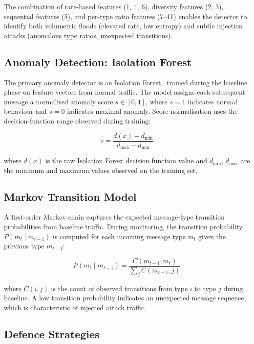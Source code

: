 The combination of rate-based features (1, 4, 6), diversity features (2, 3), sequential features (5), and per-type ratio features (7--11) enables the detector to identify both volumetric floods (elevated rate, low entropy) and subtle injection attacks (anomalous type ratios, unexpected transitions).

\subsection{Anomaly Detection: Isolation Forest}

The primary anomaly detector is an Isolation Forest~\cite{liu2008isolation} trained during the baseline phase on feature vectors from normal traffic.
The model assigns each subsequent message a normalised anomaly score $s \in [0, 1]$, where $s = 1$ indicates normal behaviour and $s = 0$ indicates maximal anomaly.
Score normalisation uses the decision-function range observed during training:

\begin{equation}
    s = \frac{d(x) - d_{\min}}{d_{\max} - d_{\min}}
\end{equation}

\noindent where $d(x)$ is the raw Isolation Forest decision function value and $d_{\min}$, $d_{\max}$ are the minimum and maximum values observed on the training set.

\subsection{Markov Transition Model}

A first-order Markov chain captures the expected message-type transition probabilities from baseline traffic.
During monitoring, the transition probability $P(m_t \mid m_{t-1})$ is computed for each incoming message type $m_t$ given the previous type $m_{t-1}$:

\begin{equation}
    P(m_t \mid m_{t-1}) = \frac{C(m_{t-1}, m_t)}{\sum_{j} C(m_{t-1}, j)}
\end{equation}

\noindent where $C(i, j)$ is the count of observed transitions from type $i$ to type $j$ during baseline.
A low transition probability indicates an unexpected message sequence, which is characteristic of injected attack traffic.

\subsection{Defence Strategies}

